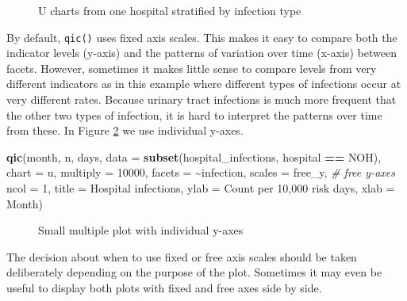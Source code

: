 \documentclass[
]{book}
\makeatletter
\newenvironment{Shaded}{\begin{snugshade}}{\end{snugshade}}
\newcommand{\AttributeTok}[1]{\textcolor[rgb]{0.13,0.29,0.53}{#1}}
\newcommand{\CommentTok}[1]{\textcolor[rgb]{0.56,0.35,0.01}{\textit{#1}}}
\newcommand{\DecValTok}[1]{\textcolor[rgb]{0.00,0.00,0.81}{#1}}
\newcommand{\FunctionTok}[1]{\textcolor[rgb]{0.13,0.29,0.53}{\textbf{#1}}}
\newcommand{\NormalTok}[1]{#1}
\newcommand{\SpecialCharTok}[1]{\textcolor[rgb]{0.81,0.36,0.00}{\textbf{#1}}}
\newcommand{\StringTok}[1]{\textcolor[rgb]{0.31,0.60,0.02}{#1}}
\newcommand*\pandocbounded[1]{%
  \sbox\pandoc@box{#1}%
  \Gscale@div\@tempa{\textheight}{\dimexpr\ht\pandoc@box+\dp\pandoc@box\relax}%
  \Gscale@div\@tempb{\linewidth}{\wd\pandoc@box}%
  \ifdim\@tempb\p@<\@tempa\p@\let\@tempa\@tempb\fi%
  \ifdim\@tempa\p@<\p@\scalebox{\@tempa}{\usebox\pandoc@box}%
  \else\usebox{\pandoc@box}%
  \fi%
}
\makeatother
\begin{document}
\begin{figure}
\centering
\pandocbounded{}
\caption{\label{fig:qicharts-hais3}U charts from one hospital stratified by infection type}
\end{figure}

By default, \texttt{qic()} uses fixed axis scales. This makes it easy to compare both the indicator levels (y-axis) and the patterns of variation over time (x-axis) between facets. However, sometimes it makes little sense to compare levels from very different indicators as in this example where different types of infections occur at very different rates. Because urinary tract infections is much more frequent that the other two types of infection, it is hard to interpret the patterns over time from these. In Figure \ref{fig:qicharts-hais4} we use individual y-axes.

\begin{Shaded}
\begin{Highlighting}[]
\FunctionTok{qic}\NormalTok{(month, n, days, }
    \AttributeTok{data     =} \FunctionTok{subset}\NormalTok{(hospital\_infections, hospital }\SpecialCharTok{==} \StringTok{\textquotesingle{}NOH\textquotesingle{}}\NormalTok{),}
    \AttributeTok{chart    =} \StringTok{\textquotesingle{}u\textquotesingle{}}\NormalTok{,}
    \AttributeTok{multiply =} \DecValTok{10000}\NormalTok{,}
    \AttributeTok{facets   =} \SpecialCharTok{\textasciitilde{}}\NormalTok{infection,}
    \AttributeTok{scales   =} \StringTok{\textquotesingle{}free\_y\textquotesingle{}}\NormalTok{,                      }\CommentTok{\# free y{-}axes}
    \AttributeTok{ncol     =} \DecValTok{1}\NormalTok{,}
    \AttributeTok{title    =} \StringTok{\textquotesingle{}Hospital infections\textquotesingle{}}\NormalTok{,}
    \AttributeTok{ylab     =} \StringTok{\textquotesingle{}Count per 10,000 risk days\textquotesingle{}}\NormalTok{,}
    \AttributeTok{xlab     =} \StringTok{\textquotesingle{}Month\textquotesingle{}}\NormalTok{)}
\end{Highlighting}
\end{Shaded}

\begin{figure}
\centering
\pandocbounded{}
\caption{\label{fig:qicharts-hais4}Small multiple plot with individual y-axes}
\end{figure}

The decision about when to use fixed or free axis scales should be taken deliberately depending on the purpose of the plot. Sometimes it may even be useful to display both plots with fixed and free axes side by side.
\end{document}
